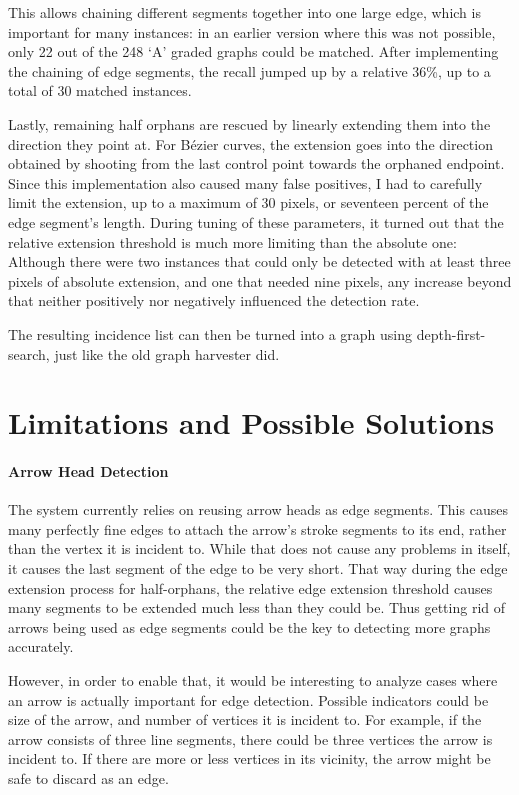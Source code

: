 \documentclass[practical,english]{info1thesis}
\begin{document}
This allows chaining different segments together into one large edge, which is important for many instances: 
in an earlier version where this was not possible, only 22 out of the 248 `A' graded graphs could be matched.
After implementing the chaining of edge segments, the recall jumped up by a relative 36\%, up to a total of 30 matched instances.



Lastly, remaining half orphans are rescued by linearly extending them into the direction they point at. 
For Bézier curves, the extension goes into the direction obtained by shooting from the last control point towards the orphaned endpoint. 
Since this implementation also caused many false positives, I had to carefully limit the extension, up to a maximum of 30 pixels, or seventeen percent of the edge segment's length.
During tuning of these parameters, it turned out that the relative extension threshold is much more limiting than the absolute one: 
Although there were two instances that could only be detected with at least three pixels of absolute extension, and one that needed nine pixels, any increase beyond that neither positively nor negatively influenced the detection rate.


The resulting incidence list can then be turned into a graph using depth-first-search, just like the old graph harvester did.

\section{Limitations and Possible Solutions}
\paragraph{Arrow Head Detection}\label{sec:arrows}
The system currently relies on reusing arrow heads as edge segments.
This causes many perfectly fine edges to attach the arrow's stroke segments to its end, rather than the vertex it is incident to.
While that does not cause any problems in itself, it causes the last segment of the edge to be very short.
That way during the edge extension process for half-orphans, the relative edge extension threshold causes many segments to be extended much less than they could be.
Thus getting rid of arrows being used as edge segments could be the key to detecting more graphs accurately.

However, in order to enable that, it would be interesting to analyze cases where an arrow is actually important for edge detection.
Possible indicators could be size of the arrow, and number of vertices it is incident to. 
For example, if the arrow consists of three line segments, there could be three vertices the arrow is incident to. 
If there are more or less vertices in its vicinity, the arrow might be safe to discard as an edge.
\end{document}
